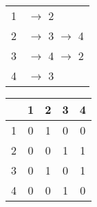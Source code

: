 \documentclass{article}
\begin{document}
    \subsection{}
        \begin{figure}[H]
            \begin{minipage}{0.8\textwidth}
                \centering
                \captionsetup{labelformat=empty}
                \caption{Listas de Adjacência}
            \end{minipage}
            \centering
            \begin{subfigure}{0.30\textwidth}
                \begin{tabular}{l | l}
                    \Large 1 & \Large $\rightarrow$ 2\\
                    \Large 2 & \Large $\rightarrow$ 3 $\rightarrow$ 4\\
                    \Large 3 & \Large $\rightarrow$ 4 $\rightarrow$ 2\\
                    \Large 4 & \Large $\rightarrow$ 3\\
                \end{tabular}
            \end{subfigure}
        \end{figure}
        \begin{figure}[H]
            \begin{minipage}{0.8\textwidth}
                \centering
                \captionsetup{labelformat=empty}
                \caption{Matriz de Adjacência}
            \end{minipage}
            \centering
            \begin{subfigure}{0.30\textwidth}
                \begin{tabular}{c|cccc}
                      & 1 & 2 & 3 & 4 \\
                \hline
                    1 & 0 & 1 & 0 & 0 \\
                    2 & 0 & 0 & 1 & 1 \\
                    3 & 0 & 1 & 0 & 1 \\
                    4 & 0 & 0 & 1 & 0 \\
                \end{tabular}
            \end{subfigure}
        \end{figure}
\end{document}
